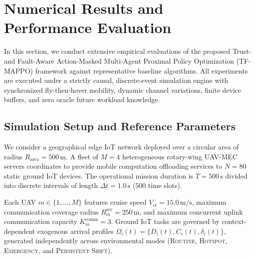 
\section{Numerical Results and Performance Evaluation}
\label{sec:numerical_results}

In this section, we conduct extensive empirical evaluations of the proposed Trust- and Fault-Aware Action-Masked Multi-Agent Proximal Policy Optimization (\textsc{TF-MAPPO}) framework against representative baseline algorithms. All experiments are executed under a strictly causal, discrete-event simulation engine with synchronized fly-then-hover mobility, dynamic channel variations, finite device buffers, and zero oracle future workload knowledge.

\subsection{Simulation Setup and Reference Parameters}
We consider a geographical edge IoT network deployed over a circular area of radius $R_{\mathrm{area}} = 500\,\mathrm{m}$. A fleet of $M = 4$ heterogeneous rotary-wing UAV-MEC servers coordinates to provide mobile computation offloading services to $N = 80$ static ground IoT devices. The operational mission duration is $T = 500\,\mathrm{s}$ divided into discrete intervals of length $\Delta t = 1.0\,\mathrm{s}$ ($500$ time slots).

Each UAV $m \in \{1,\dots,M\}$ features cruise speed $V_{\mathrm{cr}} = 15.0\,\mathrm{m/s}$, maximum communication coverage radius $R_m^{\mathrm{srv}} = 250\,\mathrm{m}$, and maximum concurrent uplink communication capacity $K_m^{\mathrm{comm}} = 3$. Ground IoT tasks are governed by context-dependent exogenous arrival profiles $\Omega_i(t) = \{D_i(t), C_i(t), \delta_i(t)\}$, generated independently across environmental modes (\textsc{Routine}, \textsc{Hotspot}, \textsc{Emergency}, and \textsc{Persistent Shift}).

